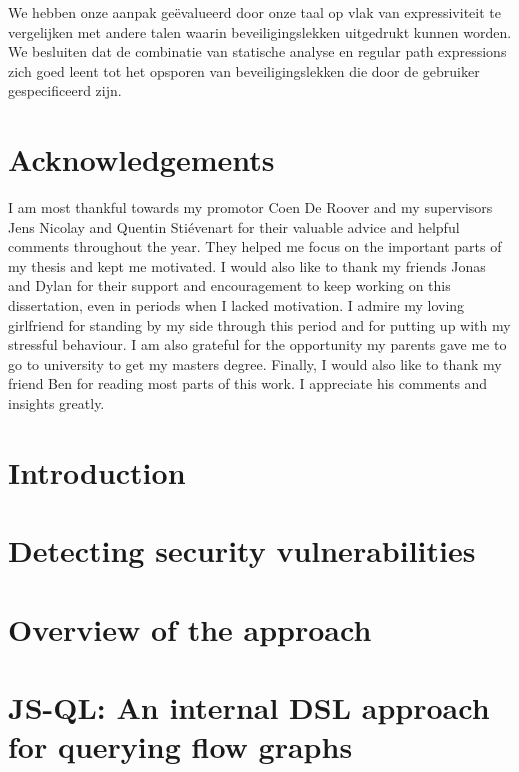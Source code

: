 \documentclass[a4paper, 12pt]{report}
\theoremstyle{definition}
\begin{document}
We hebben onze aanpak geëvalueerd door onze taal op vlak van expressiviteit te vergelijken met andere talen waarin beveiligingslekken uitgedrukt kunnen worden. We besluiten dat de combinatie van statische analyse en regular path expressions zich goed leent tot het opsporen van beveiligingslekken die door de gebruiker gespecificeerd zijn.

\chapter*{Acknowledgements}
 
I am most thankful towards my promotor Coen De Roover and my supervisors Jens Nicolay and Quentin Sti\'{e}venart for their valuable advice and helpful comments throughout the year. They helped me focus on the important parts of my thesis and kept me motivated. I would also like to thank my friends Jonas and Dylan for their support and encouragement to keep working on this dissertation, even in periods when I lacked motivation. I admire my loving girlfriend for standing by my side through this period and for putting up with my stressful behaviour. I am also grateful for the opportunity my parents gave me to go to university to get my masters degree. Finally, I would also like to thank my friend Ben for reading most parts of this work. I appreciate his comments and insights greatly.

\tableofcontents

\listoffigures
\listoftables


\chapter{Introduction}



\chapter{Detecting security vulnerabilities}
\label{ch:Background}

 
\chapter{Overview of the approach}
\label{ch:Overview}


\chapter{JS-QL: An internal DSL approach for querying flow graphs}
\label{ch:JSQL}

 
\end{document}
